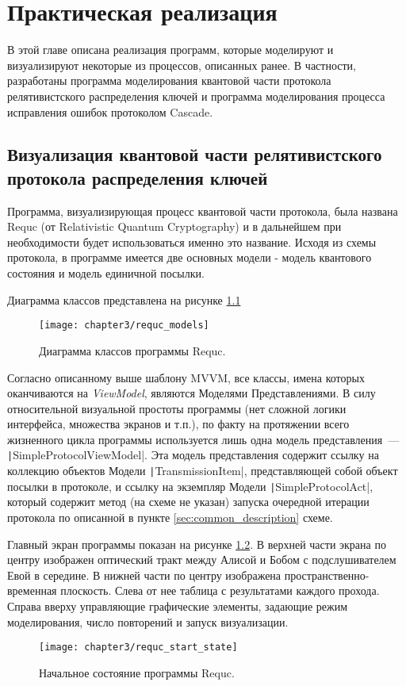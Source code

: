 \chapter{Практическая реализация}
В этой главе описана реализация программ, которые моделируют и визуализируют некоторые из процессов, описанных ранее. В частности, разработаны программа моделирования квантовой части протокола релятивистского распределения ключей и программа моделирования процесса исправления ошибок протоколом Cascade.



\section{Визуализация квантовой части релятивистского протокола распределения ключей}
Программа, визуализирующая процесс квантовой части протокола, была названа Requc (от Relativistic Quantum Cryptography) и в дальнейшем при необходимости будет использоваться именно это название.
Исходя из схемы протокола, в программе имеется две основных модели - модель квантового состояния и модель единичной посылки. 

Диаграмма классов представлена на рисунке \ref{fig:requc_models}
\begin{figure}[h]
  \texttt{[image: chapter3/requc\_models]}
  \caption{Диаграмма классов программы Requc.}
  \label{fig:requc_models}
\end{figure}

Согласно описанному выше шаблону MVVM, все классы, имена которых оканчиваются на \textit{ViewModel}, являются Моделями Представлениями. 
В силу относительной визуальной простоты программы (нет сложной логики интерфейса, множества экранов и т.п.), по факту на протяжении всего жизненного цикла программы используется лишь одна модель представления~--- \texttt|SimpleProtocolViewModel|. Эта модель представления содержит ссылку на коллекцию объектов Модели \texttt|TransmissionItem|, представляющей собой объект посылки в протоколе, и ссылку на экземпляр Модели \texttt|SimpleProtocolAct|, который содержит метод (на схеме не указан) запуска очередной итерации протокола по описанной в пункте \ref{sec:common_description} схеме.

Главный экран программы показан на рисунке \ref{fig:requc_start_state}. В верхней части экрана по центру изображен оптический тракт между Алисой и Бобом с подслушивателем Евой в середине. В нижней части по центру изображена пространственно-временная плоскость. Слева от нее таблица с результатами каждого прохода. Справа вверху управляющие графические элементы, задающие режим моделирования, число повторений и запуск визуализации.
\begin{figure}[h]
  \texttt{[image: chapter3/requc\_start\_state]}
  \caption{Начальное состояние программы Requc.}
  \label{fig:requc_start_state}
\end{figure}

